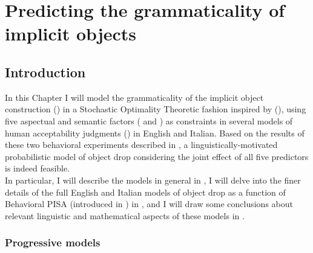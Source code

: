 \setchapterpreamble[u]{\margintoc}
\chapter{Predicting the grammaticality of implicit objects}

\section{Introduction} 

In this Chapter I will model the grammaticality of the implicit object construction () in a Stochastic Optimality Theoretic fashion inspired by \textcite{Medina2007} (), using five aspectual and semantic factors ( and ) as constraints in several models of human acceptability judgments () in English and Italian. Based on the results of these two behavioral experiments described in , a linguistically-motivated probabilistic model of object drop considering the joint effect of all five predictors is indeed feasible.\\
In particular, I will describe the models in general in , I will delve into the finer details of the full English and Italian models of object drop as a function of Behavioral PISA (introduced in ) in , and I will draw some conclusions about relevant linguistic and mathematical aspects of these models in .

\subsection{Progressive models} 

